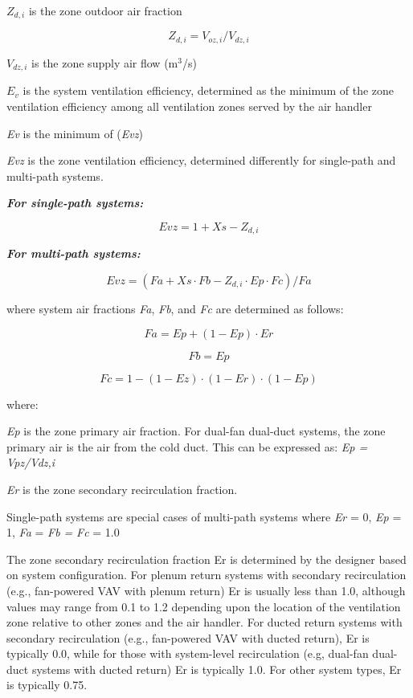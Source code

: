 \({Z_{d,i}}\) is the zone outdoor air fraction

\begin{equation}
{Z_{d,i}} = {V_{oz,i}}/{V_{dz,i}}
\end{equation}

\({V_{dz,i}}\) is the zone supply air flow (m\(^3\)/s)

\({E_v}\) is the system ventilation efficiency, determined as the minimum of the zone ventilation efficiency among all ventilation zones served by the air handler

\emph{Ev} is the minimum of (\emph{Evz})

\emph{Evz} is the zone ventilation efficiency, determined differently for single-path and multi-path systems.

\textbf{\emph{For single-path systems:}}

\begin{equation}
Evz = 1 + Xs - Z_{d,i}
\end{equation}

\textbf{\emph{For multi-path systems:}}

\begin{equation}
Evz = (Fa + Xs·Fb - Z_{d,i}·Ep·Fc)/Fa
\end{equation}

where system air fractions \emph{Fa}, \emph{Fb}, and \emph{Fc} are determined as follows:

\begin{equation}
Fa = Ep + {(1 - Ep) · Er}
\end{equation}

\begin{equation}
Fb = Ep
\end{equation}

\begin{equation}
Fc = 1 - (1 - Ez) · (1 - Er) · (1 - Ep)
\end{equation}

where:

\emph{Ep} is the zone primary air fraction. For dual-fan dual-duct systems, the zone primary air is the air from the cold duct.  This can be expressed as: \emph{Ep = Vpz/Vdz,i}

\emph{Er} is the zone secondary recirculation fraction.

Single-path systems are special cases of multi-path systems where \emph{Er} = 0, \emph{Ep} = 1, \emph{Fa} = \emph{Fb =} \emph{Fc} = 1.0

The zone secondary recirculation fraction Er is determined by the designer based on system configuration. For plenum return systems with secondary recirculation (e.g., fan-powered VAV with plenum return) Er is usually less than 1.0, although values may range from 0.1 to 1.2 depending upon the location of the ventilation zone relative to other zones and the air handler. For ducted return systems with secondary recirculation (e.g., fan-powered VAV with ducted return), Er is typically 0.0, while for those with system-level recirculation (e.g, dual-fan dual-duct systems with ducted return) Er is typically 1.0. For other system types, Er is typically 0.75.


